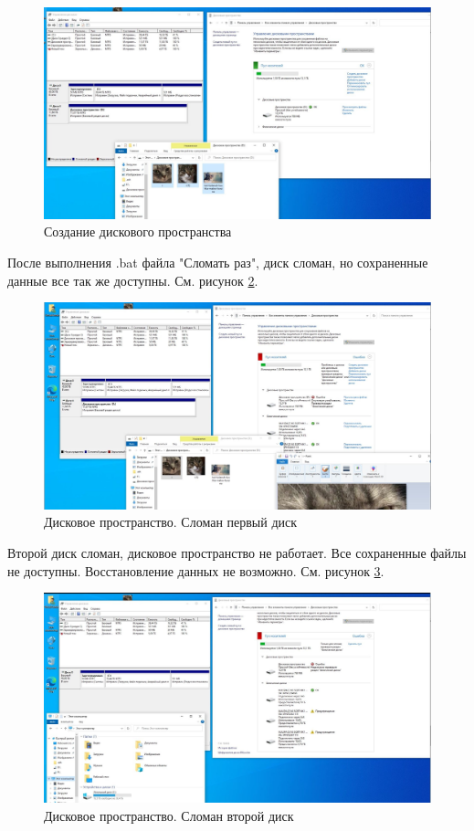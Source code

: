 \documentclass[a4paper,14pt]{extarticle}
\begin{document}
\begin{enumerate}
		
		\begin{figure}[h!]
			\centering
			\includegraphics[width=0.7\linewidth]{9}
			\caption{Создание дискового пространства}
			\label{fig:9}
		\end{figure}
\newpage
		После выполнения .bat файла "Сломать раз", диск сломан, но сохраненные данные все так же доступны. См. рисунок \ref{fig:10}.
				\begin{figure}[h!]
			\centering
			\includegraphics[width=0.7\linewidth]{10}
			\caption{Дисковое пространство. Сломан первый диск}
			\label{fig:10}
		\end{figure}
		
	
		Второй диск сломан, дисковое пространство не работает. Все сохраненные файлы не доступны. Восстановление данных не возможно. См. рисунок \ref{fig:11}.
		
			\begin{figure}[h!]
			\centering
			\includegraphics[width=0.7\linewidth]{11}
			\caption{Дисковое пространство. Сломан второй диск}
			\label{fig:11}
		\end{figure}


\end{enumerate}
\end{document}
